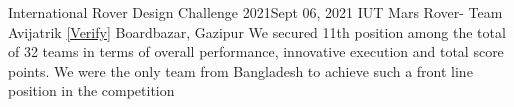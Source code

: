 \resumeSubheading
{International Rover Design Challenge 2021}{Sept 06, 2021}
{IUT Mars Rover- Team Avijatrik 
    \href{https://drive.google.com/file/d/1W0C9LzUfy7_d0nCPicmFOubpGVWgIlfj/view?usp=sharing}
    {[\underline{Verify}]}
}{Boardbazar, Gazipur}
    \resumeItemListStart
        \resumeItem
        {We secured 11th position among the total of 32 teams in terms of overall performance,
        innovative execution and total score points.}
        \resumeItem
        {We were the only team from Bangladesh to achieve such a front line position 
        in the competition}
    \resumeItemListEnd